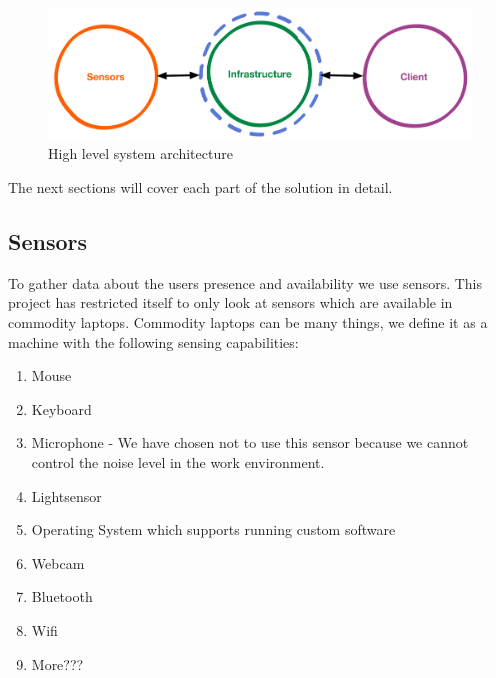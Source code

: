 \documentclass{sigchi}
\begin{document}
\begin{figure}[H]
  \centering
  \includegraphics[width=\columnwidth]{figures/system_architecture.pdf}
  \caption{High level system architecture}
  \label{fig:architecture}
\end{figure}

The next sections will cover each part of the solution in detail.


\subsection{Sensors}
To gather data about the users presence and availability we use sensors.
This project has restricted itself to only look at sensors which are available in commodity laptops.
Commodity laptops can be many things, we define it as a machine with the following sensing capabilities:
\begin{enumerate}
  \item Mouse
  \item Keyboard
  \item Microphone - We have chosen not to use this sensor because we cannot control the noise level in the work environment.
  \item Lightsensor
  \item Operating System which supports running custom software
  \item Webcam
  \item Bluetooth
  \item Wifi
  \item More???
\end{enumerate}
\end{document}

